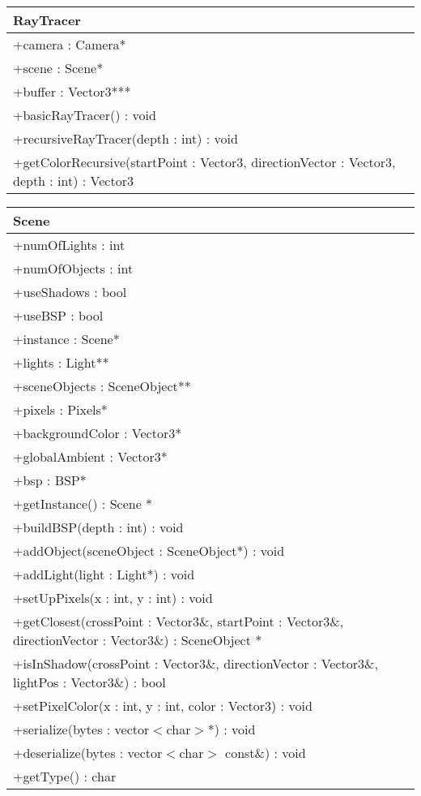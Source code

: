 \begin{center}
    \begin{tabular}{|l|}
    \hline
    RayTracer \\ \hline
    +camera : Camera* \\
    +scene : Scene* \\
    +buffer : Vector3*** \\ \hline
	+basicRayTracer() : void \\
	+recursiveRayTracer(depth : int) : void \\
	+getColorRecursive(startPoint : Vector3, directionVector : Vector3, depth : int) : Vector3 \\
	\hline
    \end{tabular}
\end{center}

\begin{center}
    \begin{tabular}{|l|}
    \hline
    Scene \\ \hline
    +numOfLights : int \\
    +numOfObjects : int \\
    +useShadows : bool \\
    +useBSP : bool \\
    +instance : Scene* \\
    +lights : Light** \\
    +sceneObjects : SceneObject** \\
    +pixels : Pixels* \\
    +backgroundColor : Vector3* \\
    +globalAmbient : Vector3* \\
    +bsp : BSP* \\
    \hline
	+getInstance() : Scene * \\
	+buildBSP(depth : int) : void \\
	+addObject(sceneObject : SceneObject*) : void \\
	+addLight(light : Light*) : void \\
	+setUpPixels(x : int, y : int) : void \\
	+getClosest(crossPoint : Vector3\&, startPoint : Vector3\&, directionVector : Vector3\&) : SceneObject * \\
	+isInShadow(crossPoint : Vector3\&, directionVector : Vector3\&, lightPos : Vector3\&) : bool \\
	+setPixelColor(x : int, y : int, color : Vector3) : void \\
	+serialize(bytes : vector$<$char$>$*) : void \\
	+deserialize(bytes : vector$<$char$>$ const\&) : void \\
	+getType() : char \\
	\hline
    \end{tabular}
\end{center}

